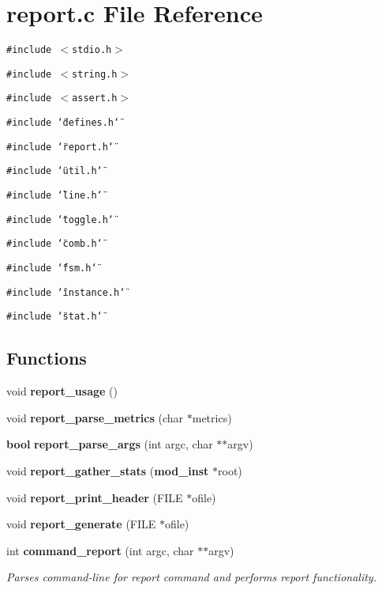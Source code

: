 \section{report.c File Reference}
\label{report_8c}
{\tt \#include $<$stdio.h$>$}\par
{\tt \#include $<$string.h$>$}\par
{\tt \#include $<$assert.h$>$}\par
{\tt \#include \char`\"{}defines.h\char`\"{}}\par
{\tt \#include \char`\"{}report.h\char`\"{}}\par
{\tt \#include \char`\"{}util.h\char`\"{}}\par
{\tt \#include \char`\"{}line.h\char`\"{}}\par
{\tt \#include \char`\"{}toggle.h\char`\"{}}\par
{\tt \#include \char`\"{}comb.h\char`\"{}}\par
{\tt \#include \char`\"{}fsm.h\char`\"{}}\par
{\tt \#include \char`\"{}instance.h\char`\"{}}\par
{\tt \#include \char`\"{}stat.h\char`\"{}}\par
\subsection*{Functions}
\begin{CompactItemize}
\item 
void {\bf report\_\-usage} ()
\item 
void {\bf report\_\-parse\_\-metrics} (char $\ast$metrics)
\item 
{\bf bool} {\bf report\_\-parse\_\-args} (int argc, char $\ast$$\ast$argv)
\item 
void {\bf report\_\-gather\_\-stats} ({\bf mod\_\-inst} $\ast$root)
\item 
void {\bf report\_\-print\_\-header} (FILE $\ast$ofile)
\item 
void {\bf report\_\-generate} (FILE $\ast$ofile)
\item 
int {\bf command\_\-report} (int argc, char $\ast$$\ast$argv)
\begin{CompactList}\small\item\em Parses command-line for report command and performs report functionality.\item\end{CompactList}\end{CompactItemize}
